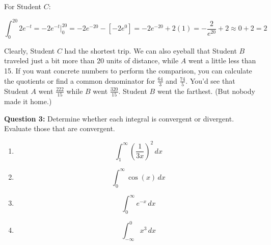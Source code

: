 \documentclass[12pt]{article}
\begin{document}
For Student $C$:

$$\int_0^{20} 2e^{-t} = -2e^{-t} \bigg|_0^{20} = -2e^{-20} - [-2e^{0}] = -2e^{-20} + 2(1) = -\frac{2}{e^{20}} + 2 \approx 0 + 2 = 2$$

Clearly, Student $C$ had the shortest trip. We can also eyeball that Student $B$ traveled just a bit more than 20 units of distance, while $A$ went a little less than 15. If you want concrete numbers to perform the comparison, you can calculate the quotients or find a common denominator for $\frac{64}{3}$ and $\frac{74}{5}$. You'd see that Student $A$ went $\frac{222}{15}$ while $B$ went $\frac{320}{15}$. Student $B$ went the farthest. (But nobody made it home.)

\noindent \textbf{Question 3:} Determine whether each integral is convergent or divergent. Evaluate those that are convergent.
\begin{multicols}{2}
\begin{enumerate}
\item $$\int_1^{\infty} \left(\frac{1}{3x}\right)^2 \,dx$$
\item $$\int_0^{\infty} \cos (x) \, dx$$
\item $$\int_0^{\infty} e^{-x} \,dx$$
\item $$\int_{-\infty}^0 x^3 \,dx$$
\end{enumerate}
\end{multicols}
\end{document}

